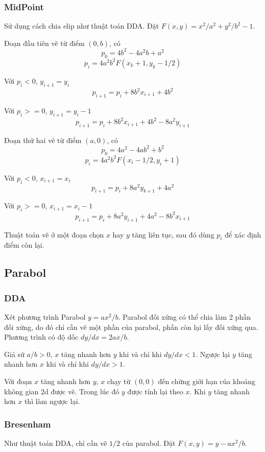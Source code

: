 \documentclass[12pt]{article}
\begin{document}
\subsubsection{MidPoint}
Sử dụng cách chia elip như thuật toán DDA.
Đặt \(F(x, y) = x^2/a^2 + y^2/b^2 - 1\).

Đoạn đầu tiên vẽ từ điểm \((0, b)\), có
\[p_0 = 4b^2 - 4a^2 b + a^2\]
\[p_i = 4a^2 b^2 F(x_k + 1, y_k - 1/2)\]

Với \(p_i < 0\), \(y_{i+1} = y_i\)
\[p_{i+1} = p_i + 8b^2 x_{i+1} + 4b^2\]

Với \(p_i >= 0\), \(y_{i+1} = y_i - 1\)
\[p_{i+1} = p_i + 8b^2 x_{i+1} + 4b^2 - 8a^2 y_{i+1}\]

Đoạn thứ hai vẽ từ điểm \((a, 0)\), có
\[p_0 = 4a^2 - 4a b^2 + b^2\]
\[p_i = 4a^2 b^2 F(x_i - 1/2, y_i + 1)\]

Với \(p_i < 0\), \(x_{i+1} = x_i\)
\[p_{i+1} = p_i + 8a^2 y_{k+1} + 4a^2\]

Với \(p_i >= 0\), \(x_{i+1} = x_i - 1\)
\[p_{i+1} = p_i + 8a^2 y_{i+1} + 4a^2 - 8b^2 x_{i+1}\]

Thuật toán vẽ ở một đoạn chọn \(x\) hay \(y\) tăng liên tục,
sau đó dùng \(p_i\) để xác định điểm còn lại.

\subsection{Parabol}

\subsubsection{DDA}
Xét phương trình Parabol \(y = ax^2/b\).
Parabol đối xứng có thể chia làm 2 phần đối xứng,
do đó chỉ cần vẽ một phần của parabol, phần còn lại lấy đối xứng qua.
Phương trình có độ dốc \(dy/dx = 2ax/b\).

Giả sử \(a/b > 0\), \(x\) tăng nhanh hơn \(y\) khi và chỉ khi \(dy/dx < 1\).
Ngược lại \(y\) tăng nhanh hơn \(x\) khi và chỉ khi \(dy/dx > 1\).

Với đoạn \(x\) tăng nhanh hơn \(y\), \(x\) chạy từ \((0, 0)\) đến chừng giới hạn của khoảng không gian 2d được vẽ.
Trong lúc đó \(y\) được tính lại theo \(x\). Khi \(y\) tăng nhanh hơn \(x\) thì làm ngược lại.

\subsubsection{Bresenham}
Như thuật toán DDA, chỉ cần vẽ \(1/2\) của parabol.
Đặt \(F(x, y) = y - ax^2/b\).
\end{document}

